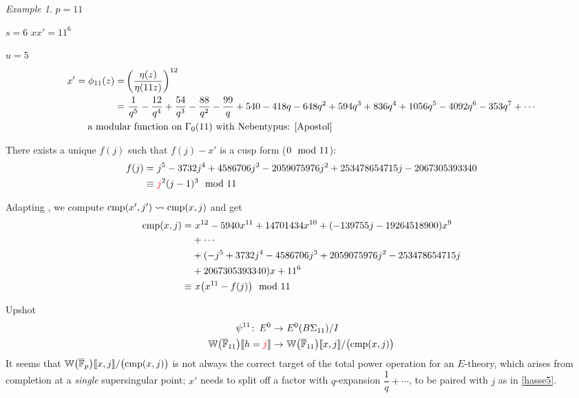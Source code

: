 \documentclass{rs}
\theoremstyle{definition}
\theoremstyle{remark}
\newtheorem{ex}[equation]{Example}
\def\co{\colon\thinspace}
\newcommand{\mb}[1]{\mathbb{#1}}
\newcommand{\cF}{\overline {\mb F}}
\newcommand{\cmp}{{\rm cmp}}
\newcommand{\BW}{{\mb W}}
\newcommand{\md}{~~{\rm mod}~}
\newcommand{\G}{\Gamma}
\newcommand{\lb}{\llbracket}
\newcommand{\rb}{\rrbracket}
\renewcommand{\=}{\approx}
\renewcommand{\-}{\sim}
\newcommand{\rd}[1]{{\textcolor{red}{#1}}}
\numberwithin{equation}{section}
\begin{document}
\begin{ex}
 $p = 11$ 

 $s = 6$ \qquad $x x' = 11^6$ 

 $u = 5$ 
 \[
  \begin{split}
   x' = \phi_{11}(z) = & \left( \frac{\eta(z)}{\eta(11 z)} \right)^{12} \\
                     = & ~ \frac{1}{q^5} - \frac{12}{q^4} + \frac{54}{q^3} - \frac{88}{q^2} - \frac{99}{q} + 540 - 418 q - 648 q^2 + 594 q^3 + 836 q^4 + 1056 q^5 - 4092 q^6 - 353 q^7 + \cdots \\
                       & \hskip -1.35cm \text{a modular function on $\G_0(11)$ with Nebentypus: \cite[pp86-87]{Apostol}} 
  \end{split}
 \]

 There exists a unique $f(j)$ such that $f(j) - x'$ is a cusp form ($0 \md 11$): 
 \[
  \begin{split}
   f(j) = & ~ j^5 - 3732 j^4 + 4586706 j^3 - 2059075976 j^2 + 253478654715 j - 2067305393340 \\
   \equiv & ~ \rd{j}^2 (j - 1)^3 \md 11 
  \end{split}
 \]

 Adapting \cite[(2.4)]{Choi}, we compute $\cmp(x',j') \leadsto \cmp(x,j)$ and get 
 \[
  \begin{split}
   \cmp(x,j) = & ~ x^{12}-5940 x^{11}+14701434 x^{10}+(-139755 j-19264518900) x^9 \\
               & + \cdots \\
               & +(-j^5+3732 j^4-4586706 j^3+2059075976 j^2-253478654715 j \\
               & +2067305393340) x+11^6 \\
        \equiv & ~ x \big(x^{11} - f(j)\big) \md 11 
  \end{split}
 \]

 Upshot 
 \[
  \begin{split}
                         \psi^{11} \co E^0 \to & ~ E^0(B\Sigma_{11}) / I \\
   \BW\big(\cF_{11}\big)\lb h = \rd{j} \rb \to & ~ \BW\big(\cF_{11}\big)\lb x,j \rb / \big(\cmp(x,j)\big) 
  \end{split}
 \]
 It seems that $\BW\big(\cF_p\big)\lb x,j \rb / \big(\cmp(x,j)\big)$ is not always the correct target of the total power operation for an $E$-theory, 
 which arises from completion at a {\em single} supersingular point; 
 $x'$ needs to split off a factor with $q$-expansion $\dfrac{1}{q} + \cdots$, to be paired with $j$ as in \eqref{hasse5}.  
\end{ex}
\end{document}
